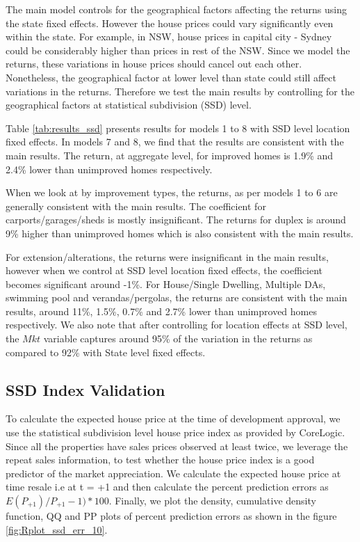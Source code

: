 The main model controls for the geographical factors affecting the returns using the state fixed effects. However the house prices could vary significantly even within the state. For example, in NSW, house prices in capital city - Sydney could be considerably higher than prices in rest of the NSW. Since we model the returns, these variations in house prices should cancel out each other. Nonetheless, the geographical factor at lower level than state could still affect variations in the returns. Therefore we test the main results by controlling for the geographical factors at statistical subdivision (SSD) level.

Table \ref{tab:results_ssd} presents results for models 1 to 8 with SSD level location fixed effects. In models 7 and 8, we find that the results are consistent with the main results. The return, at aggregate level, for improved homes is 1.9\% and 2.4\% lower than unimproved homes respectively. 


When we look at by improvement types, the returns, as per models 1 to 6 are generally consistent with the main results. The coefficient for carports/garages/sheds is mostly insignificant. The returns for duplex is around 9\% higher than unimproved homes which is also consistent with the main results.

For extension/alterations, the returns were insignificant in the main results, however when we control at SSD level location fixed effects, the coefficient becomes significant around -1\%. For House/Single Dwelling, Multiple DAs, swimming pool and verandas/pergolas, the returns are consistent with the main results, around 11\%, 1.5\%, 0.7\% and 2.7\% lower than unimproved homes respectively. We also note that after controlling for location effects at SSD level, the $Mkt$ variable captures around 95\% of the variation in the returns as compared to 92\% with State level fixed effects.
 
 
 
 \subsection{SSD Index Validation}

To calculate the expected house price at the time of development approval, we use the statistical subdivision level house price index as provided by CoreLogic. Since all the properties have sales prices observed at least twice, we leverage the repeat sales information, to test whether the house price index is a good predictor of the market appreciation. We calculate the expected house price at time resale i.e at t = +1 and then calculate the percent prediction errors as $E(P_{+1})/P_{+1} - 1) * 100$. Finally, we plot the density, cumulative density function, QQ and PP plots of percent prediction errors as shown in the figure \ref{fig:Rplot_ssd_err_10}. 

